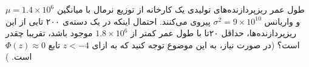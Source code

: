 \problem{}
طول عمر ریزپردازنده‌های تولیدی یک کارخانه از توزیع نرمال با میانگین
$\mu = 1.4 \times 10^6$
و واریانس
$\sigma^2 = 9 \times 10^{10}$
پیروی می‌کنند. احتمال اینکه در یک دسته‌ی ۲۰۰ تایی از این ریزپردازنده‌ها، حداقل ۲۰تا با طول عمر کمتر از
$1.8 \times 10^6 $
موجود باشد، تقریبا چقدر است؟ (در صورت نیاز، به این موضوع توجه کنید که به ازای
$z < -4$
تابع 
$\Phi(z) \approx 0$
است. )